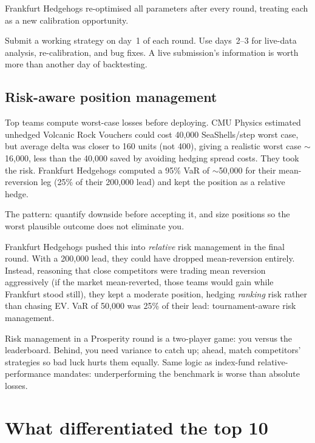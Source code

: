 Frankfurt Hedgehogs re-optimised all parameters after every round,
treating each as a new calibration opportunity.

\begin{keyfactbox}
Submit a working strategy on day~1 of each round.  Use days~2--3
for live-data analysis, re-calibration, and bug fixes.  A live
submission's information is worth more than another day of
backtesting.
\end{keyfactbox}

\subsection{Risk-aware position management}
\label{sec:risk_aware}

Top teams compute worst-case losses before deploying.  CMU Physics
estimated unhedged Volcanic Rock Vouchers could cost 40{,}000
SeaShells/step worst case, but average delta was closer to 160
units (not 400), giving a realistic worst case $\sim$16{,}000, less
than the 40{,}000 saved by avoiding hedging spread costs.  They
took the risk.  Frankfurt Hedgehogs computed a 95\% VaR of
$\sim$50{,}000 for their mean-reversion leg (25\% of their
200{,}000 lead) and kept the position as a relative hedge.

The pattern: quantify downside before accepting it, and size
positions so the worst plausible outcome does not eliminate you.

Frankfurt Hedgehogs pushed this into \emph{relative} risk
management in the final round.  With a 200{,}000 lead, they could
have dropped mean-reversion entirely.  Instead, reasoning that
close competitors were trading mean reversion aggressively (if
the market mean-reverted, those teams would gain while Frankfurt
stood still), they kept a moderate position, hedging
\emph{ranking} risk rather than chasing EV.  VaR of 50{,}000 was
25\% of their lead: tournament-aware risk management.

\begin{intuitionbox}
Risk management in a Prosperity round is a two-player game: you
versus the leaderboard.  Behind, you need variance to catch up;
ahead, match competitors' strategies so bad luck hurts them
equally.  Same logic as index-fund relative-performance mandates:
underperforming the benchmark is worse than absolute losses.
\end{intuitionbox}


\section{What differentiated the top 10}
\label{sec:top_different}

